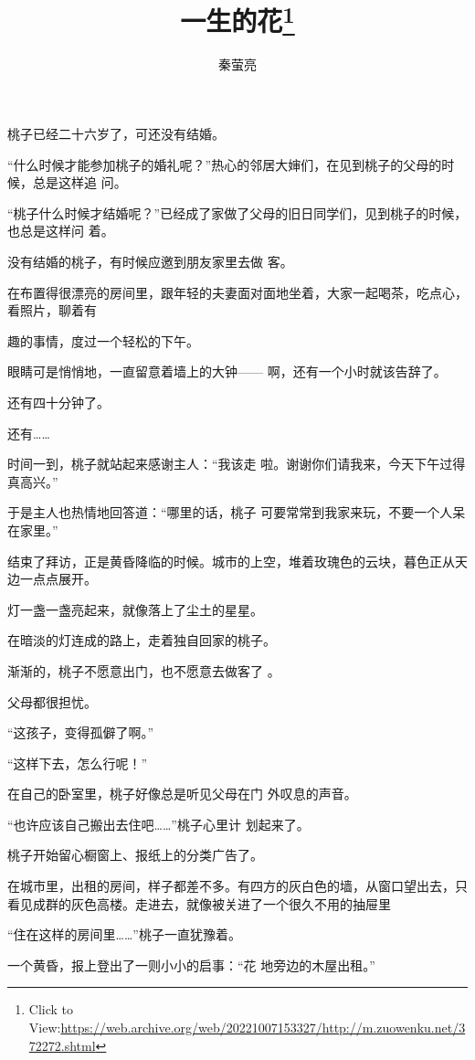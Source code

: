 \documentclass{article}
\title{一生的花\footnote{Click to View:\url{https://web.archive.org/web/20221007153327/http://m.zuowenku.net/372272.shtml}}}
\author{秦萤亮}
\date{}
\begin{document}

\maketitle


\Large


﻿桃子已经二十六岁了，可还没有结婚。 

“什么时候才能参加桃子的婚礼呢？”热心的邻居大婶们，在见到桃子的父母的时候，总是这样追
问。 

“桃子什么时候才结婚呢？”已经成了家做了父母的旧日同学们，见到桃子的时候，也总是这样问
着。 

没有结婚的桃子，有时候应邀到朋友家里去做
客。 

在布置得很漂亮的房间里，跟年轻的夫妻面对面地坐着，大家一起喝茶，吃点心，看照片，聊着有
\newpage

趣的事情，度过一个轻松的下午。 

眼睛可是悄悄地，一直留意着墙上的大钟——
啊，还有一个小时就该告辞了。 


还有四十分钟了。 


还有…… 

时间一到，桃子就站起来感谢主人：“我该走
啦。谢谢你们请我来，今天下午过得真高兴。” 

于是主人也热情地回答道：“哪里的话，桃子
可要常常到我家来玩，不要一个人呆在家里。” 

结束了拜访，正是黄昏降临的时候。城市的上空，堆着玫瑰色的云块，暮色正从天边一点点展开。
 

灯一盏一盏亮起来，就像落上了尘土的星星。

\newpage
在暗淡的灯连成的路上，走着独自回家的桃子。 

渐渐的，桃子不愿意出门，也不愿意去做客了
。 


父母都很担忧。 


“这孩子，变得孤僻了啊。” 


“这样下去，怎么行呢！” 

在自己的卧室里，桃子好像总是听见父母在门
外叹息的声音。 

“也许应该自己搬出去住吧……”桃子心里计
划起来了。 

桃子开始留心橱窗上、报纸上的分类广告了。

在城市里，出租的房间，样子都差不多。有四方的灰白色的墙，从窗口望出去，只看见成群的灰色高楼。走进去，就像被关进了一个很久不用的抽屉里
\newpage


“住在这样的房间里……”桃子一直犹豫着。

一个黄昏，报上登出了一则小小的启事：“花
地旁边的木屋出租。” 
\end{document}
